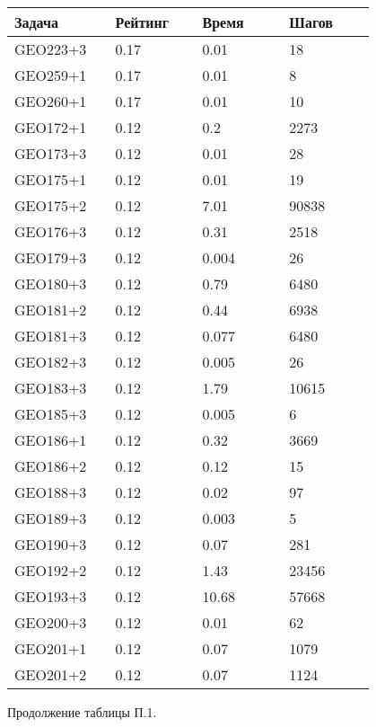 \begin{longtable}[H]{|p{0.2\linewidth}|p{0.2\linewidth}|p{0.2\linewidth}|p{0.2\linewidth}|}
\hline
\textbf{Задача} & \textbf{Рейтинг} & \textbf{Время} & \textbf{Шагов} \\
\hline
GEO223+3 & 0.17 & 0.01 & 18  \\
\hline
GEO259+1 & 0.17 & 0.01 & 8  \\
\hline
GEO260+1 & 0.17 & 0.01 & 10 \\
\hline
GEO172+1 & 0.12 &  0.2 & 2273 \\
\hline
GEO173+3 & 0.12 &  0.01 & 28 \\
\hline
GEO175+1 & 0.12 &  0.01 & 19 \\
\hline
GEO175+2 & 0.12 &  7.01 & 90838 \\
\hline
GEO176+3 & 0.12 &  0.31 & 2518 \\
\hline
GEO179+3 & 0.12 &  0.004 & 26 \\
\hline
GEO180+3 & 0.12 &  0.79 & 6480 \\
\hline
GEO181+2 & 0.12 &  0.44 & 6938 \\
\hline
GEO181+3 & 0.12 &  0.077 & 6480 \\
\hline
GEO182+3 & 0.12 &  0.005 & 26 \\
\hline
GEO183+3 & 0.12 &  1.79 & 10615 \\
\hline
GEO185+3 & 0.12 &  0.005 & 6 \\
\hline
GEO186+1 & 0.12 &  0.32 & 3669 \\
\hline
GEO186+2 & 0.12 &  0.12 & 15 \\
\hline
GEO188+3 & 0.12 &  0.02 & 97 \\
\hline
GEO189+3 & 0.12 &  0.003 & 5 \\
\hline
GEO190+3 & 0.12 &  0.07 & 281 \\
\hline
GEO192+2 & 0.12 &  1.43 & 23456 \\
\hline
GEO193+3 & 0.12 &  10.68 & 57668 \\
\hline
GEO200+3 & 0.12 &  0.01 & 62 \\
\hline
GEO201+1 & 0.12 &  0.07 & 1079 \\
\hline
GEO201+2 & 0.12 &  0.07 & 1124 \\
\hline
\end{longtable}
\begin{center}
Продолжение таблицы П.1.
\end{center}

